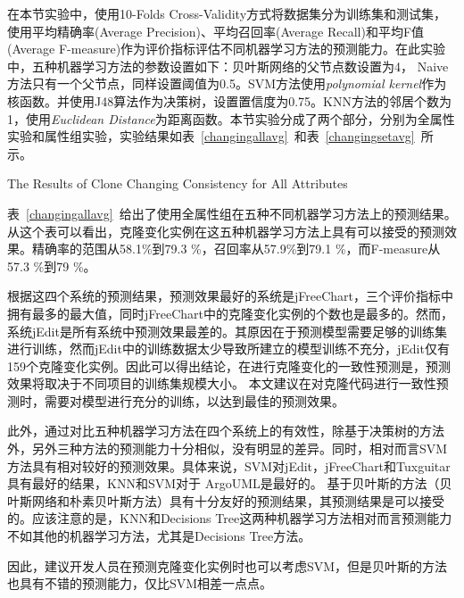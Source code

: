 在本节实验中，使用10-Folds Cross-Validity方式将数据集分为训练集和测试集，使用平均精确率(Average Precision)、平均召回率(Average Recall)和平均F值(Average F-measure)作为评价指标评估不同机器学习方法的预测能力。在此实验中，五种机器学习方法的参数设置如下：贝叶斯网络的父节点数设置为4， Naive方法只有一个父节点，同样设置阈值为0.5。SVM方法使用{\em polynomial kernel\/}作为核函数。并使用J48算法作为决策树，设置置信度为0.75。KNN方法的邻居个数为1，使用{\em Euclidean Distance\/}为距离函数。本节实验分成了两个部分，分别为全属性实验和属性组实验，实验结果如表~\ref{changingallavg}~和表~\ref{changingsetavg}~所示。

{The Results of Clone Changing Consistency for All Attributes}

表~\ref{changingallavg}~给出了使用全属性组在五种不同机器学习方法上的预测结果。从这个表可以看出，克隆变化实例在这五种机器学习方法上具有可以接受的预测效果。精确率的范围从58.1\%到79.3 \%，召回率从57.9\%到79.1 \%，而F-measure从57.3 \%到79 \%。

根据这四个系统的预测结果，预测效果最好的系统是jFreeChart，三个评价指标中拥有最多的最大值，同时jFreeChart中的克隆变化实例的个数也是最多的。然而，系统jEdit是所有系统中预测效果最差的。其原因在于预测模型需要足够的训练集进行训练，然而jEdit中的训练数据太少导致所建立的模型训练不充分，jEdit仅有159个克隆变化实例。因此可以得出结论，在进行克隆变化的一致性预测是，预测效果将取决于不同项目的训练集规模大小。
本文建议在对克隆代码进行一致性预测时，需要对模型进行充分的训练，以达到最佳的预测效果。

此外，通过对比五种机器学习方法在四个系统上的有效性，除基于决策树的方法外，另外三种方法的预测能力十分相似，没有明显的差异。同时，相对而言SVM方法具有相对较好的预测效果。具体来说，SVM对jEdit，jFreeChart和Tuxguitar具有最好的结果，KNN和SVM对于 ArgoUML是最好的。
基于贝叶斯的方法（贝叶斯网络和朴素贝叶斯方法）具有十分友好的预测结果，其预测结果是可以接受的。应该注意的是，KNN和Decisions Tree这两种机器学习方法相对而言预测能力不如其他的机器学习方法，尤其是Decisions Tree方法。

因此，建议开发人员在预测克隆变化实例时也可以考虑SVM，但是贝叶斯的方法也具有不错的预测能力，仅比SVM相差一点点。

